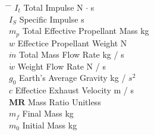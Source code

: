 \documentclass[12pt]{article}
\begin{document}
\begin{tabbing}
\hspace{2cm} \= \hspace{7cm} \= \kill
    $I_t$                  \> Total Impulse                   \> N $\cdot$ s \\
    $I_S$                  \> Specific Impulse                \> s           \\
    $m_p$                  \> Total Effective Propellant Mass \> kg          \\
    $w$                    \> Effectice Propellant Weight     \> N           \\
    $\dot{m}$              \> Total Mass Flow Rate            \> kg / s      \\
    $\dot{w}$              \> Weight Flow Rate                \> N / s       \\
    $g_0$                  \> Earth's Average Gravity         \> kg / $s^2$  \\
    $c$                    \> Effectice Exhaust Velocity      \> m / s       \\
    $\mathbf{M}\mathbf{R}$ \> Mass Ratio                      \> Unitless    \\
    $m_f$                  \> Final Mass                      \> kg          \\
    $m_0$                  \> Initial Mass                    \> kg          \\
\end{tabbing}
\end{document}
